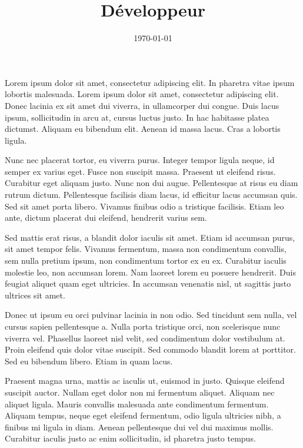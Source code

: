 \documentclass[11pt,a4paper,sans]{moderncv}
\title{Développeur \Cpp{}}
\date{\today}
\renewcommand{\_}{\textscale{.5}{\textunderscore}}
\begin{document}
\makelettertitle{}

Lorem ipsum dolor sit amet, consectetur adipiscing elit. In pharetra vitae ipsum lobortis malesuada. Lorem ipsum dolor sit amet, consectetur adipiscing elit. Donec lacinia ex sit amet dui viverra, in ullamcorper dui congue. Duis lacus ipsum, sollicitudin in arcu at, cursus luctus justo. In hac habitasse platea dictumst. Aliquam eu bibendum elit. Aenean id massa lacus. Cras a lobortis ligula.

Nunc nec placerat tortor, eu viverra purus. Integer tempor ligula neque, id semper ex varius eget. Fusce non suscipit massa. Praesent ut eleifend risus. Curabitur eget aliquam justo. Nunc non dui augue. Pellentesque at risus eu diam rutrum dictum. Pellentesque facilisis diam lacus, id efficitur lacus accumsan quis. Sed sit amet porta libero. Vivamus finibus odio a tristique facilisis. Etiam leo ante, dictum placerat dui eleifend, hendrerit varius sem.

Sed mattis erat risus, a blandit dolor iaculis sit amet. Etiam id accumsan purus, sit amet tempor felis. Vivamus fermentum, massa non condimentum convallis, sem nulla pretium ipsum, non condimentum tortor ex eu ex. Curabitur iaculis molestie leo, non accumsan lorem. Nam laoreet lorem eu posuere hendrerit. Duis feugiat aliquet quam eget ultricies. In accumsan venenatis nisl, ut sagittis justo ultrices sit amet.

Donec ut ipsum eu orci pulvinar lacinia in non odio. Sed tincidunt sem nulla, vel cursus sapien pellentesque a. Nulla porta tristique orci, non scelerisque nunc viverra vel. Phasellus laoreet nisl velit, sed condimentum dolor vestibulum at. Proin eleifend quis dolor vitae suscipit. Sed commodo blandit lorem at porttitor. Sed eu bibendum libero. Etiam in quam lacus.

Praesent magna urna, mattis ac iaculis ut, euismod in justo. Quisque eleifend suscipit auctor. Nullam eget dolor non mi fermentum aliquet. Aliquam nec aliquet ligula. Mauris convallis malesuada ante condimentum fermentum. Aliquam tempus, neque eget eleifend fermentum, odio ligula ultricies nibh, a finibus mi ligula in diam. Aenean pellentesque dui vel dui maximus mollis. Curabitur iaculis justo ac enim sollicitudin, id pharetra justo tempus.

\makeletterclosing{}
\end{document}
